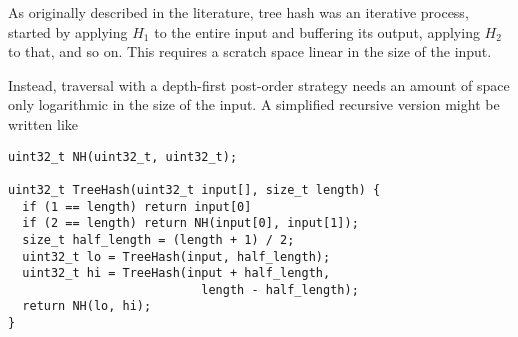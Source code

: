 \documentclass[sigconf, nonacm]{acmart}
\begin{document}




As originally described in the literature, tree hash was an iterative process, started by applying $H_1$ to the entire input and buffering its output, applying $H_2$ to that, and so on.
This requires a scratch space linear in the size of the input.

Instead, traversal with a depth-first post-order strategy needs an amount of space only logarithmic in the size of the input.
A simplified recursive version might be written like

\begin{lstlisting}
uint32_t NH(uint32_t, uint32_t);

uint32_t TreeHash(uint32_t input[], size_t length) {
  if (1 == length) return input[0]
  if (2 == length) return NH(input[0], input[1]);
  size_t half_length = (length + 1) / 2;
  uint32_t lo = TreeHash(input, half_length);
  uint32_t hi = TreeHash(input + half_length,
                           length - half_length);
  return NH(lo, hi);
}
\end{lstlisting}
\end{document}
